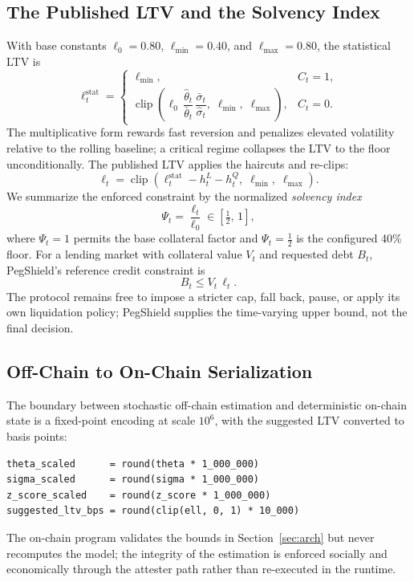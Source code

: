 \documentclass[aps,prx,reprint,nofootinbib,longbibliography]{revtex4-2}
\newcommand{\clip}{\operatorname{clip}}
\begin{document}
\subsection{The Published LTV and the Solvency Index}

With base constants $\ell_0=0.80$, $\ell_{\min}=0.40$, and $\ell_{\max}=0.80$, the
statistical LTV is
\begin{equation}
\ell^{\mathrm{stat}}_t =
\begin{cases}
\ell_{\min}, & C_t=1,\\[2pt]
\clip\!\left(
\ell_0\,
\dfrac{\hat{\theta}_t}{\bar{\theta}_t}\,
\dfrac{\bar{\sigma}_t}{\hat{\sigma}_t},\;
\ell_{\min},\;
\ell_{\max}
\right), & C_t=0.
\end{cases}
\label{eq:stat-ltv}
\end{equation}
The multiplicative form rewards fast reversion and penalizes elevated volatility
relative to the rolling baseline; a critical regime collapses the LTV to the floor
unconditionally. The published LTV applies the haircuts and re-clips:
\begin{equation}
\ell_t =
\clip\!\left(\ell^{\mathrm{stat}}_t-h^L_t-h^Q_t,\;\ell_{\min},\;\ell_{\max}\right).
\label{eq:published-ltv}
\end{equation}
We summarize the enforced constraint by the normalized \emph{solvency index}
\begin{equation}
\Psi_t=\frac{\ell_t}{\ell_0}\in\left[\tfrac12,\,1\right],
\label{eq:psi}
\end{equation}
where $\Psi_t=1$ permits the base collateral factor and $\Psi_t=\tfrac12$ is the
configured 40\% floor. For a lending market with collateral value $V_t$ and
requested debt $B_t$, PegShield's reference credit constraint is
\begin{equation}
B_t \leq V_t\,\ell_t.
\label{eq:borrow-constraint}
\end{equation}
The protocol remains free to impose a stricter cap, fall back, pause, or apply its
own liquidation policy; PegShield supplies the time-varying upper bound, not the
final decision.

\subsection{Off-Chain to On-Chain Serialization}

The boundary between stochastic off-chain estimation and deterministic on-chain
state is a fixed-point encoding at scale $10^6$, with the suggested LTV converted
to basis points:
\begin{lstlisting}
theta_scaled      = round(theta * 1_000_000)
sigma_scaled      = round(sigma * 1_000_000)
z_score_scaled    = round(z_score * 1_000_000)
suggested_ltv_bps = round(clip(ell, 0, 1) * 10_000)
\end{lstlisting}
The on-chain program validates the bounds in Section~\ref{sec:arch} but never
recomputes the model; the integrity of the estimation is enforced socially and
economically through the attester path rather than re-executed in the runtime.
\end{document}

